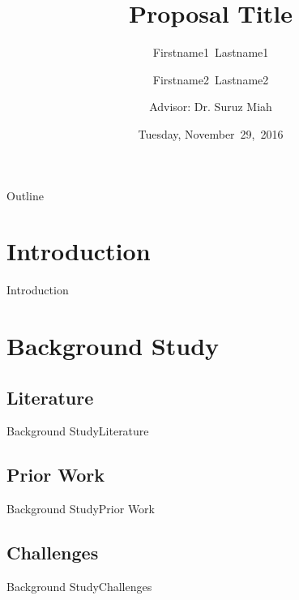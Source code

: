 \documentclass{beamer}
\title[Proposal Short Title]{Proposal Title}
\author[F.~LastName1, F.~LastName2]{Firstname1~Lastname1 \and Firstname2~Lastname2 \\\and
Advisor: Dr. Suruz Miah}
\institute[Bradley University] %
{
  Department of Electrical and Computer Engineering\\
  Bradley University\\
  1501 W. Bradley Avenue\\
  Peoria, IL, 61625, USA
}
\date[November~29,~2016]{Tuesday, November~29,~2016}
\begin{document}
\begin{frame}
  \titlepage
\end{frame}

\begin{frame}{Outline}
  \tableofcontents
\end{frame}

\section{Introduction}

\begin{frame}{Introduction}{}
\end{frame}


\section{Background Study}

\subsection{Literature}

\begin{frame}{Background Study}{Literature}
  
\end{frame}


\subsection{Prior Work}

\begin{frame}{Background Study}{Prior Work}
  
\end{frame}


\subsection{Challenges}

\begin{frame}{Background Study}{Challenges}
  
\end{frame}
\end{document}
